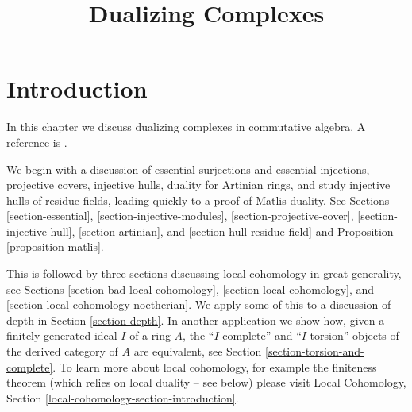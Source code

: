 \documentclass{stacks-project}
\theoremstyle{plain}
\theoremstyle{definition}
\theoremstyle{remark}
\numberwithin{equation}{subsection}
\begin{document}
\title{Dualizing Complexes}


\maketitle

\label{section-phantom}

\tableofcontents

\section{Introduction}
\label{section-introduction}

\noindent
In this chapter we discuss dualizing complexes in commutative algebra.
A reference is \cite{RD}.

\medskip\noindent
We begin with a discussion of
essential surjections and essential injections,
projective covers,
injective hulls,
duality for Artinian rings, and
study injective hulls of residue fields,
leading quickly to a proof of Matlis duality.
See Sections \ref{section-essential},
\ref{section-injective-modules},
\ref{section-projective-cover},
\ref{section-injective-hull},
\ref{section-artinian}, and
\ref{section-hull-residue-field} and
Proposition \ref{proposition-matlis}.

\medskip\noindent
This is followed by three sections discussing local cohomology in
great generality, see Sections \ref{section-bad-local-cohomology},
\ref{section-local-cohomology}, and \ref{section-local-cohomology-noetherian}.
We apply some of this to a discussion of depth in
Section \ref{section-depth}. In another application we show how,
given a finitely generated ideal $I$ of a ring $A$, the
``$I$-complete'' and ``$I$-torsion'' objects
of the derived category of $A$ are equivalent, see
Section \ref{section-torsion-and-complete}.
To learn more about local cohomology, for example the finiteness
theorem (which relies on local duality -- see below) please visit
Local Cohomology, Section \ref{local-cohomology-section-introduction}.
\end{document}
